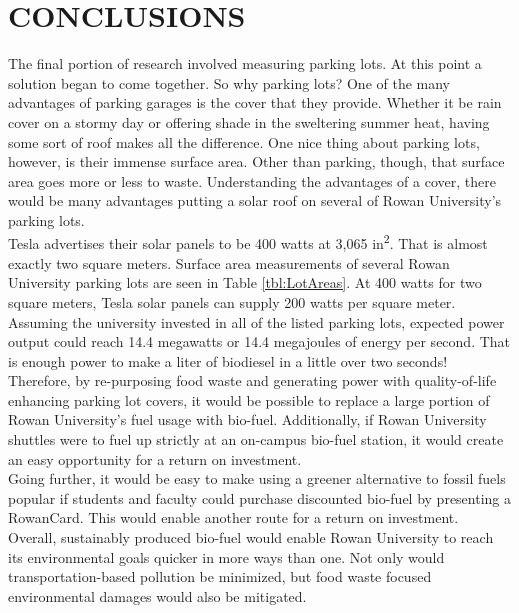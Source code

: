 \documentclass[man]{apa7}
\begin{document}
	\section{CONCLUSIONS}
	The final portion of research involved measuring parking lots. At this point a solution began to come together. So why parking lots? One of the many advantages of parking garages is the cover that they provide. Whether it be rain cover on a stormy day or offering shade in the sweltering summer heat, having some sort of roof makes all the difference. One nice thing about parking lots, however, is their immense surface area. Other than parking, though, that surface area goes more or less to waste. Understanding the advantages of a cover, there would be many advantages putting a solar roof on several of Rowan University's parking lots.
	\\
	Tesla advertises their solar panels to be 400 watts at 3,065 in\textsuperscript{2}. That is almost exactly two square meters. Surface area measurements of several Rowan University parking lots are seen in Table \ref{tbl:LotAreas}. At 400 watts for two square meters, Tesla solar panels can supply 200 watts per square meter. Assuming the university invested in all of the listed parking lots, expected power output could reach 14.4 megawatts or 14.4 megajoules of energy per second. That is enough power to make a liter of biodiesel in a little over two seconds!
	\\
	Therefore, by re-purposing food waste and generating power with quality-of-life enhancing parking lot covers, it would be possible to replace a large portion of Rowan University's fuel usage with bio-fuel. Additionally, if Rowan University shuttles were to fuel up strictly at an on-campus bio-fuel station, it would create an easy opportunity for a return on investment.
	\\
	Going further, it would be easy to make using a greener alternative to fossil fuels popular if students and faculty could purchase discounted bio-fuel by presenting a RowanCard. This would enable another route for a return on investment.
	\\
	Overall, sustainably produced bio-fuel would enable Rowan University to reach its environmental goals quicker in more ways than one. Not only would transportation-based pollution be minimized, but food waste focused environmental damages would also be mitigated.
	
\end{document}
